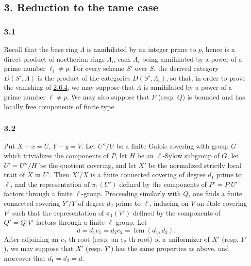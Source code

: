 \documentclass[11pt]{article}
\begin{document}
\subsection*{3. Reduction to the tame case}\label{sga5:IIIB:subsection:3}

\subsubsection*{3.1}\label{sga5:IIIB:subsubsection:3.1}
Recall that the base ring $\Lambda$ is annihilated by an integer prime to $p$, hence is a direct product of noetherian rings $\Lambda_i$, each $\Lambda_i$ being annihilated by a power of a prime number $\ell_i\ne p$. For every scheme $S'$ over $S$, the derived category $D(S',\Lambda)$ is the product of the categories $D(S',\Lambda_i)$, so that, in order to prove the vanishing of \hyperref[sga5:IIIB:equation:2.6.4]{2.6.4}, we may suppose that $\Lambda$ is annihilated by a power of a prime number $\ell\ne p$. We may also suppose that $P$ (resp. $Q$) is bounded and has locally free components of finite type.

\subsubsection*{3.2}\label{sga5:IIIB:subsubsection:3.2}
Put $X-x=U$, $Y-y=V$. Let $U''/U$ be a finite Galois covering with group $G$ which trivializes the components of $P$, let $H$ be an $\ell$-Sylow subgroup of $G$, let $U'=U''/H$ be the quotient covering, and let $X'$ be the normalized strictly local trait of $X$ in $U'$. Then $X'/X$ is a finite connected covering of degree $d_1$ prime to $\ell$, and the representation of $\pi_1(U')$ defined by the components of $P'=P|U'$ factors through a finite $\ell$-group. Proceeding similarly with $Q$, one finds a finite connected covering $Y'/Y$ of degree $d_2$ prime to $\ell$, inducing on $V$ an étale covering $V'$ such that the representation of $\pi_1(V')$ defined by the components of $Q'=Q|V'$ factors through a finite $\ell$-group. Let
\[
d=d_1e_1=d_2e_2=\operatorname{lcm}(d_1,d_2).
\]
After adjoining an $e_1$-th root (resp. an $e_2$-th root) of a uniformizer of $X'$ (resp. $Y'$), we may suppose that $X'$ (resp. $Y'$) has the same properties as above, and moreover that $d_1=d_2=d$.
\end{document}
